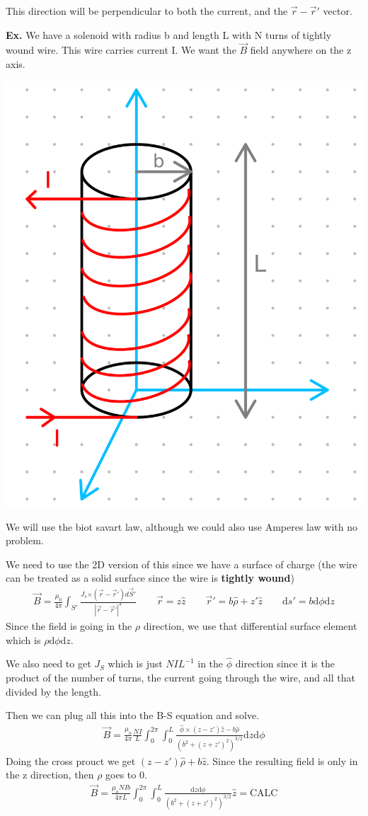 \documentclass[12pt,letterpaper]{article} \usepackage{amsmath} \usepackage{graphicx} \usepackage[margin=1in]{geometry} \usepackage{longtable}  \usepackage{amssymb}
\begin{document}
	This direction will be perpendicular to both the current, and the $\vec r-\vec r\prime$ vector. 
	
	\begin{mdframed}
		\textbf{Ex. } We have a solenoid with radius b and length L with N turns of tightly wound wire. This wire carries current I. We want the $\vec B$ field anywhere on the z axis. 
		\begin{center}
			\includegraphics[width=0.34\linewidth]{ex2}
		\end{center}
		We will use the biot savart law, although we could also use Amperes law with no problem. 
		
		We need to use the 2D version of this since we have a surface of charge (the wire can be treated as a solid surface since the wire is \textbf{tightly wound})
		\begin{align*}
			\vec B = \frac{\mu_0}{4\pi}\int_{S\prime}\frac{J_s\mathrm \times (\vec r - \vec r\prime)d \vec S\prime}{|\vec r - \vec r\prime |^3} \qquad \vec r = z \hat z \qquad \vec r\prime = b\hat \rho + z\prime \hat z \qquad \mathrm d s\prime = b \mathrm d \phi \mathrm d z 
		\end{align*}
		Since the field is going in the $\rho$ direction, we use that differential surface element which is $\rho \mathrm d \phi \mathrm d z$.
		
		We also need to get $J_S$ which is just $NIL^{-1}$ in the $\hat \phi$ direction since it is the product of the number of turns, the current going through the wire, and all that divided by the length. 
		
		Then we can plug all this into the B-S equation and solve. 
		\begin{align*}
			\vec B = \frac{\mu_o}{4\pi} 
			\frac{NI}{L}\int_0^{2\pi} \int_0^{L}\frac{\hat \phi\times (z-z\prime)\hat z -b\hat\rho}{(b^2+(z+z\prime)^2)^{3/2}}\mathrm d z \mathrm d \phi
		\end{align*}
		Doing the cross prouct we get $(z-z\prime) \hat \rho + b \hat z$. Since the resulting field is only in the z direction, then $\rho$ goes to 0. 
		\begin{align*}
			\vec B = \frac{\mu_o NI b}{4\pi L}\int_0^{2\pi} \int_0^{L}\frac{\mathrm d z \mathrm d \phi}{(b^2+(z+z\prime)^2)^{3/2}} \hat z = \text{CALC}
		\end{align*}
		
	\end{mdframed}
	
\end{document}
